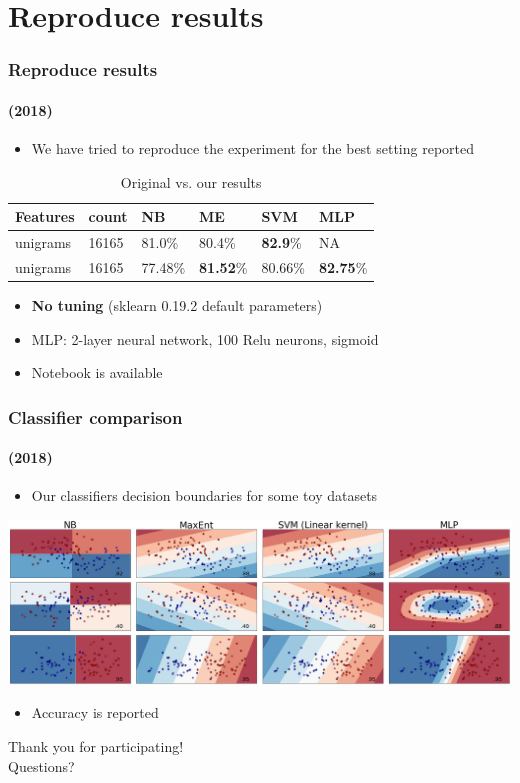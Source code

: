 \documentclass{beamer}
\begin{document}
\section{Reproduce results}
\begin{frame}
	\frametitle{Reproduce results}
	\framesubtitle{(2018)}
	\begin{itemize}
		\item We have tried to reproduce the experiment for the best setting reported
	\end{itemize}
	\begin{center}
		\begin{table}
			\begin{tabular}{l | l | l || l | l | l}
				Features & count & NB & ME & SVM & MLP\\ \hline \hline
				unigrams & 16165 & 81.0\% & 80.4\% & \textbf{82.9}\% & NA \\
				unigrams & 16165 & 77.48\% & \textbf{81.52}\% & 80.66\% & \textbf{82.75}\%  \\
			\end{tabular}
			\caption{Original vs. our results}
		\end{table}
	\end{center}
	\begin{itemize}
		\item \textbf{No tuning} (sklearn 0.19.2 default parameters)
		\item MLP: 2-layer neural network, 100 Relu neurons, sigmoid
		\item Notebook is available \href{https://github.com/dorcoh/sentiment-emnlp/blob/master/experiment/sentiment-analysis-emnlp2002.ipynb}{}
	\end{itemize}
\end{frame}

\begin{frame}
	\frametitle{Classifier comparison}
	\framesubtitle{(2018)}
	\begin{itemize}
		\item Our classifiers decision boundaries for some toy datasets
	\end{itemize}
	\begin{center}
		\includegraphics[scale=0.26]{comparison}
	\end{center}
	\begin{itemize}
		\item Accuracy is reported
	\end{itemize}
\end{frame}
\fi

\begin{frame}
	\centering
	\huge
	Thank you for participating! \\
	Questions?
\end{frame}
\end{document}
